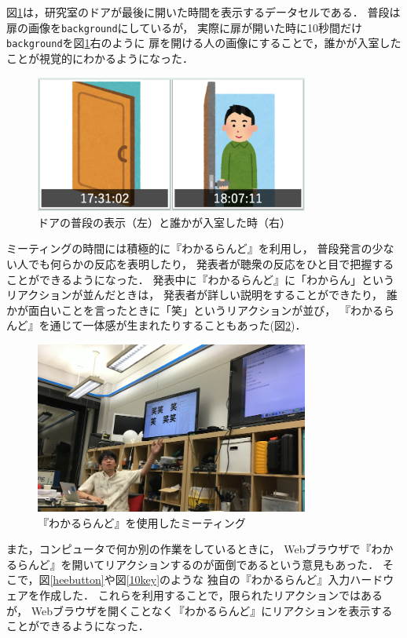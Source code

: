 図\ref{door}は，研究室のドアが最後に開いた時間を表示するデータセルである．
普段は扉の画像を\texttt{background}にしているが，
実際に扉が開いた時に10秒間だけ\texttt{background}を図\ref{door}右のように
扉を開ける人の画像にすることで，誰かが入室したことが視覚的にわかるようになった．

\begin{figure}[h]
\centering
\includegraphics[width=9cm]{images/door.png}
\caption{ドアの普段の表示（左）と誰かが入室した時（右）}
\label{door}
\end{figure}

ミーティングの時間には積極的に『わかるらんど』を利用し，
普段発言の少ない人でも何らかの反応を表明したり，
発表者が聴衆の反応をひと目で把握することができるようになった．
発表中に『わかるらんど』に「わからん」というリアクションが並んだときは，
発表者が詳しい説明をすることができたり，
誰かが面白いことを言ったときに「笑」というリアクションが並び，
『わかるらんど』を通じて一体感が生まれたりすることもあった(図\ref{wara})．

\begin{figure}[h]
\centering
\includegraphics[width=9cm]{images/wara.png}
\caption{『わかるらんど』を使用したミーティング}
\label{wara}
\end{figure}

また，コンピュータで何か別の作業をしているときに，
Webブラウザで『わかるらんど』を開いてリアクションするのが面倒であるという意見もあった．
そこで，図\ref{heebutton}や図\ref{10key}のような
独自の『わかるらんど』入力ハードウェアを作成した．
これらを利用することで，限られたリアクションではあるが，
Webブラウザを開くことなく『わかるらんど』にリアクションを表示することができるようになった．

